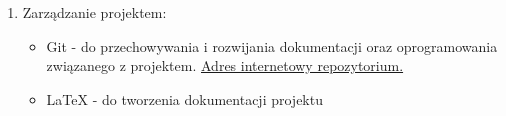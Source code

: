 \documentclass[a4paper]{article}
\begin{document}
\begin{enumerate}

\item Zarządzanie projektem:
\begin{itemize}
\item Git - do przechowywania i rozwijania dokumentacji oraz oprogramowania związanego z projektem.
\href{https://github.com/hizonglol/wds-2016}{Adres internetowy repozytorium.}
\item LaTeX - do tworzenia dokumentacji projektu
\end{itemize}
\end{enumerate}
\end{document}
